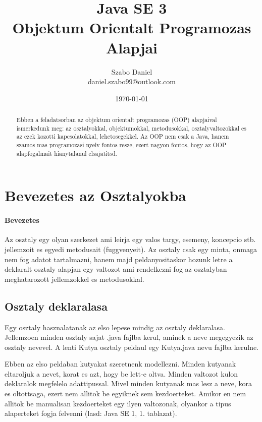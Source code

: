 \documentclass{article}
\title{%
Java SE 3 \\
\large Objektum Orientalt Programozas Alapjai}
\author{Szabo Daniel\\daniel.szabo99@outlook.com}
\date{\today}
\begin{document}
\maketitle
\begin{abstract}
Ebben a feladatsorban az objektum orientalt programozas (OOP) alapjaival ismerkedunk meg: az osztalyokkal,
objektumokkal, metodusokkal, osztalyvaltozokkal es az ezek kozotti kapcsolatokkal, lehetosegekkel. Az OOP nem csak a
Java, hanem szamos mas programozasi nyelv fontos resze, ezert nagyon fontos, hogy az OOP alapfogalmait hianytalanul
elsajatitsd.
\end{abstract}

\newpage

\tableofcontents{}

\newpage

\section{Bevezetes az Osztalyokba}

\paragraph{Bevezetes}

Az osztaly egy olyan szerkezet ami leirja egy valos targy, esemeny, koncepcio stb. jellemzoit es egyedi metodusait
(fuggvenyeit). Az osztaly csak egy minta, onmaga nem fog adatot tartalmazni, hanem majd peldanyositaskor hozunk
letre a deklaralt osztaly alapjan egy valtozot ami rendelkezni fog az osztalyban meghatarozott jellemzokkel es metodusokkal.

\subsection{Osztaly deklaralasa}

Egy osztaly hasznalatanak az elso lepese mindig az osztaly deklaralasa. Jellemzoen minden osztaly sajat .java fajlba
kerul, aminek a neve megegyezik az osztaly nevevel. A lenti Kutya osztaly peldaul egy Kutya.java nevu fajlba kerulne.

Ebben az elso peldaban kutyakat szeretnenk modellezni. Minden kutyanak eltaroljuk a nevet, korat es azt, hogy be
lett-e oltva. Minden valtozot kulon deklaralok megfelelo adattipussal. Mivel minden kutyanak mas lesz a neve, kora es
oltottsaga, ezert nem allitok be egyiknek sem kezdoerteket. Amikor en nem allitok be manualisan kezdoerteket egy
ilyen valtozonak, olyankor a tipus alaperteket fogja felvenni (lasd: Java SE 1, 1. tablazat).
\end{document}
